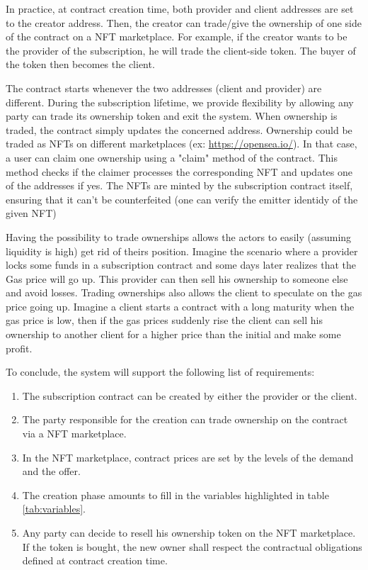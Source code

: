In practice, at contract creation time, both provider and client addresses are set to the creator address. Then, the creator can trade/give the ownership of one side of the contract on a NFT marketplace. For example, if the creator wants to be the provider of the subscription, he will trade the client-side token. The buyer of the token then becomes the client. 

The contract starts whenever the two addresses (client and provider) are different. During the subscription lifetime, we provide flexibility by allowing any party can trade its ownership token and exit the system. When ownership is traded, the contract simply updates the concerned address. Ownership could  be traded as NFTs on different marketplaces (ex: \href{opensea}{https://opensea.io/}). In that case, a user can claim one ownership using a "claim" method of the contract. This method checks if the claimer processes the corresponding NFT and updates one of the addresses if yes. The NFTs are minted by the subscription contract itself, ensuring that it can't be counterfeited (one can verify the emitter identidy of the given NFT)

Having the possibility to trade ownerships allows the actors to easily (assuming liquidity is high) get rid of theirs position. Imagine the scenario where a provider locks some funds in a subscription contract and some days later realizes that the Gas price will go up. This provider can then sell his ownership to someone else and avoid losses. Trading ownerships also allows the client to speculate on the gas price going up. Imagine a client starts a contract with a long maturity when the gas price is low, then if the gas prices suddenly rise the client can sell his ownership to another client for a higher price than the initial and make some profit.

To conclude, the system will support the following list of requirements: 
\begin{enumerate}
    \item The subscription contract can be created by either the provider or the client. 
    \item The party responsible for the creation can trade ownership on the contract via a NFT marketplace.
    \item In the NFT marketplace, contract prices are set by the levels of the demand and the offer.  
    \item The creation phase amounts to fill in the variables highlighted in table \ref{tab:variables}. 
    \item Any party can decide to resell his ownership token on the NFT marketplace. If the token is bought, the new owner shall respect the contractual obligations defined at contract creation time.
\end{enumerate}

